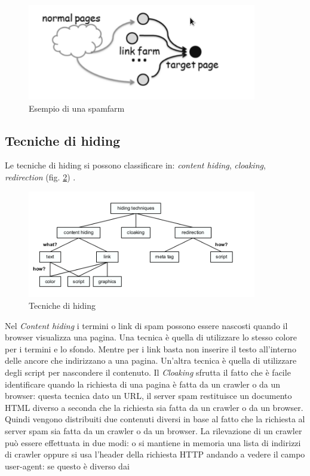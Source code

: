 \begin{figure} 
 \centering
 \includegraphics[width=10cm]{immagini/spamfarm}
 \caption{Esempio di una spamfarm}
 \label{fig:spamfarm}
\end{figure}

\subsection{Tecniche di hiding}
Le tecniche di hiding si possono classificare in: \textit{content hiding}, \textit{cloaking}, \textit{redirection} (fig. \ref{fig:tecnicheHiding}) \cite{ilprints646}.
\begin{figure} 
 \centering
 \includegraphics[width=10cm]{immagini/tassonomiaHiding}
 \caption{Tecniche di hiding}
 \label{fig:tecnicheHiding}
\end{figure}
Nel \textit{Content hiding} i termini o link di spam possono essere nascosti quando il browser visualizza una pagina. Una tecnica è quella di utilizzare lo stesso colore per i termini e lo sfondo. Mentre per i link basta non inserire il testo all'interno delle ancore che indirizzano a una pagina. Un'altra tecnica è quella di utilizzare degli script per nascondere il contenuto. Il \textit{Cloaking} sfrutta il fatto che è facile identificare quando la richiesta di una pagina è fatta da un crawler o da un browser: questa tecnica dato un URL, il server spam restituisce un documento HTML diverso a seconda che la richiesta sia fatta da un crawler o da un browser. Quindi vengono distribuiti due contenuti diversi in base al fatto che la richiesta al server spam sia fatta da un crawler o da un browser. La rilevazione di un crawler può essere effettuata in due modi: o si mantiene in memoria una lista di indirizzi di crawler oppure si usa l'header della richiesta HTTP andando a vedere il campo user-agent: se questo è diverso dai 

